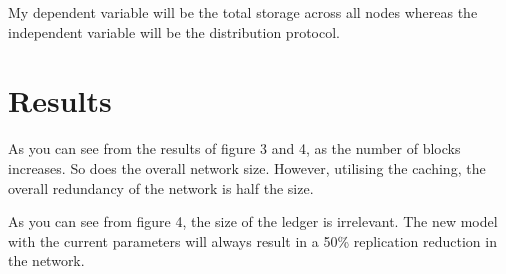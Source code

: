 \documentclass{article}
\begin{document}
\begin{CJK}{UTF8}{gbsn}
My dependent variable will be the total storage across all nodes whereas the independent variable will be the distribution protocol.

\section{Results}
As you can see from the results of figure 3 and 4, as the number of blocks increases. So does the overall network size. However, utilising the caching, the overall redundancy of the network is half the size. 

\noindent{}

As you can see from figure 4, the size of the ledger is irrelevant. The new model with the current parameters will always result in a 50\% replication reduction in the network.

\noindent{}


\end{CJK}
\end{document}
